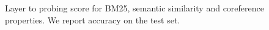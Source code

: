 \begin{figure}[!h]
    \centering
    \begin{subfigure}{\textwidth}
        \centering
    \end{subfigure}

    \begin{subfigure}{\textwidth}
        \centering
    \end{subfigure}

    \begin{subfigure}{\textwidth}
        \centering
    \end{subfigure}

    \caption{Layer to probing score for BM25, semantic similarity and coreference properties. We report accuracy on the test set.}
    \label{fig:sem_sim_coref}
\end{figure}

